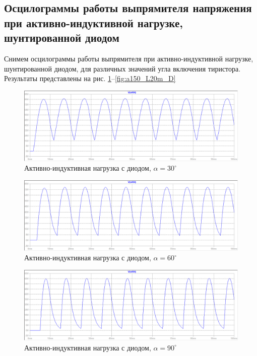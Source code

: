 \documentclass[a4paper, 12pt]{article}
\begin{document}
    \subsection{Осцилограммы работы выпрямителя напряжения при активно-индуктивной нагрузке, шунтированной диодом}
    Снимем осцилограммы работы выпрямителя при активно-индуктивной нагрузке, шунтированной диодом, для различных значений
    угла включения тиристора. Результаты представлены на рис. \ref{fig:a30_L20m_D}--\ref{fig:a150_L20m_D}
    \begin{figure}[H]
        \centering
        \includegraphics[scale=0.45]{a30_L20m_D.png}
        \captionsetup{skip=0pt}
        \caption{Активно-индуктивная нагрузка с диодом, $\alpha=30^{\circ}$}
        \label{fig:a30_L20m_D}
    \end{figure}
    \begin{figure}[H]
        \centering
        \includegraphics[scale=0.45]{a60_L20m_D.png}
        \captionsetup{skip=0pt}
        \caption{Активно-индуктивная нагрузка с диодом, $\alpha=60^{\circ}$}
        \label{fig:a60_L20m_D}
    \end{figure}
    \begin{figure}[H]
        \centering
        \includegraphics[scale=0.45]{a90_L20m_D.png}
        \captionsetup{skip=0pt}
        \caption{Активно-индуктивная нагрузка с диодом, $\alpha=90^{\circ}$}
        \label{fig:a90_L20m_D}
    \end{figure}
\end{document}
